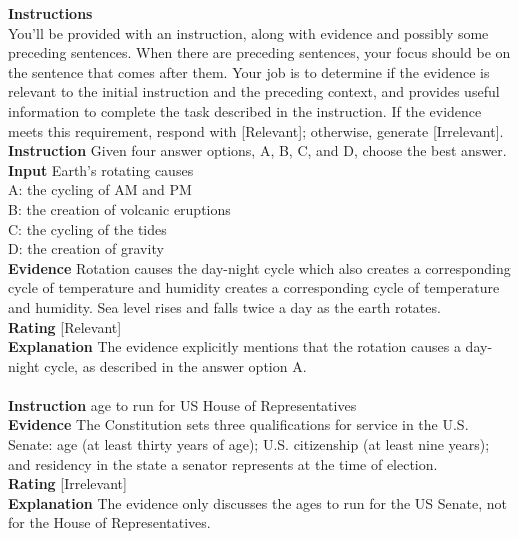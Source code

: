 \begin{table}[h!]
\begin{tcolorbox}
{\bf Instructions}\\ 
You'll be provided with an instruction, along with evidence and possibly some preceding sentences. When there are preceding sentences, your focus should be on the sentence that comes after them. Your job is to determine if the evidence is relevant to the initial instruction and the preceding context, and provides useful information to complete the task described in the instruction. If the evidence meets this requirement, respond with [Relevant]; otherwise, generate [Irrelevant].
\tcblower
{\bf Instruction} Given four answer options, A, B, C, and D, choose the best answer. \\
{\bf Input} Earth's rotating causes \\
A: the cycling of AM and PM \\
B: the creation of volcanic eruptions \\
C: the cycling of the tides \\
D: the creation of gravity \\ 
{\bf Evidence} Rotation causes the day-night cycle which also creates a corresponding cycle of temperature and humidity creates a corresponding cycle of temperature and humidity. Sea level rises and falls twice a day as the earth rotates. \\
{\bf Rating} [Relevant] \\
{\bf Explanation} The evidence explicitly mentions that the rotation causes a day-night cycle, as described in the answer option A. \\
\\
{\bf Instruction} age to run for US House of Representatives \\
{\bf Evidence} The Constitution sets three qualifications for service in the U.S. Senate: age (at least thirty years of age); U.S. citizenship (at least nine years); and residency in the state a senator represents at the time of election. \\
{\bf Rating} [Irrelevant] \\
{\bf Explanation} The evidence only discusses the ages to run for the US Senate, not for the House of Representatives.  
\end{tcolorbox}
\caption{\label{tab:algo_box_relevant} Instructions and demonstrations for \crel~aspect given the input only. }
\end{table}


